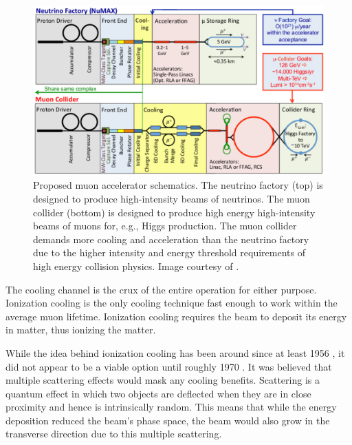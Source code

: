 \begin{figure}
  \centering
    \includegraphics[width=\textwidth]{Figures/muon_accelerator_schematic} 
  \caption[Proposed muon accelerator schematics.]{Proposed muon accelerator schematics. The neutrino factory (top) is designed to produce high-intensity beams of neutrinos. The muon collider (bottom) is designed to produce high energy high-intensity beams of muons for, e.g., Higgs production. The muon collider demands more cooling and acceleration than the neutrino factory due to the higher intensity and energy threshold requirements of high energy collision physics. Image courtesy of \cite{map}.}
  \label{fig:muon_accelerator_schematic}
\end{figure}


The cooling channel is the crux of the entire operation for either purpose. Ionization cooling is the only cooling technique fast enough to work within the average muon lifetime. Ionization cooling requires the beam to deposit its energy in matter, thus ionizing the matter.

While the idea behind ionization cooling has been around since at least 1956 \cite{oneill,lichtenberg}, it did not appear to be a viable option until roughly 1970 \cite{YuM}. It was believed that multiple scattering effects would mask any cooling benefits. Scattering is a quantum effect in which two objects are deflected when they are in close proximity and hence is intrinsically random. This means that while the energy deposition reduced the beam's phase space, the beam would also grow in the transverse direction due to this multiple scattering.

